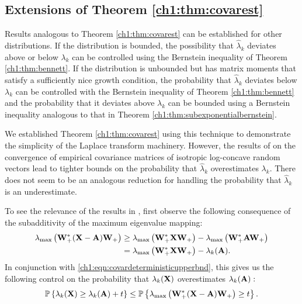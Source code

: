 \subsection{Extensions of Theorem \ref{ch1:thm:covarest}}
Results analogous to Theorem \ref{ch1:thm:covarest} can be established for other
distributions. If the distribution is bounded, the possibility that
$\hat{\lambda}_k$ deviates above or below $\lambda_k$ can be controlled using
the Bernstein inequality of Theorem \ref{ch1:thm:bennett}. If the distribution is
unbounded but has matrix moments that satisfy a sufficiently nice growth
condition, the probability that $\hat{\lambda}_k$ deviates below $\lambda_k$ can
be controlled with the Bernstein inequality of Theorem \ref{ch1:thm:bennett} and the
probability that it deviates above $\lambda_k$ can be bounded using a Bernstein
inequality analogous to that in Theorem \ref{ch1:thm:subexponentialbernstein}.

We established Theorem \ref{ch1:thm:covarest} using this technique to demonstrate
the simplicity of the Laplace transform machinery. However, the results of
\cite{ALPT10b} on the convergence of empirical covariance matrices of isotropic
log-concave random vectors lead to tighter bounds on the probability that
$\hat{\lambda}_k$ overestimates $\lambda_k.$ There does not seem to be an
analogous reduction for handling the probability that $\hat{\lambda}_k$ is an
underestimate.

To see the relevance of the results in \cite{ALPT10b}, first observe the
following consequence of the subadditivity of the maximum eigenvalue mapping:
\begin{align*}
\lambda_{\mathrm{max}}\left(\mathbf{W}_+^*(\mathbf{X} - \mathbf{A}) \mathbf{W}_+\right) & \geq
\lambda_{\mathrm{max}}\left(\mathbf{W}_+^* \mathbf{X} \mathbf{W}_+\right) - \lambda_{\mathrm{max}}\left(\mathbf{W}_+^*
\mathbf{A} \mathbf{W}_+\right) \\
 &= \lambda_{\mathrm{max}}\left(\mathbf{W}_+^* \mathbf{X} \mathbf{W}_+\right) - \lambda_k(\mathbf{A}).
\end{align*}
In conjunction with \eqref{ch1:eqn:covardeterministicupperbnd}, this gives us the
following control on the probability that $\lambda_k(\mathbf{X})$ overestimates
$\lambda_k(\mathbf{A}):$ 
\[
 \mathbb{P}\left\{\lambda_k(\mathbf{X}) \geq \lambda_k(\mathbf{A}) + t\right\} \leq
\mathbb{P}\left\{\lambda_{\mathrm{max}}\left(\mathbf{W}_+^* (\mathbf{X} - \mathbf{A}) \mathbf{W}_+\right) \geq t\right\}.
\]

